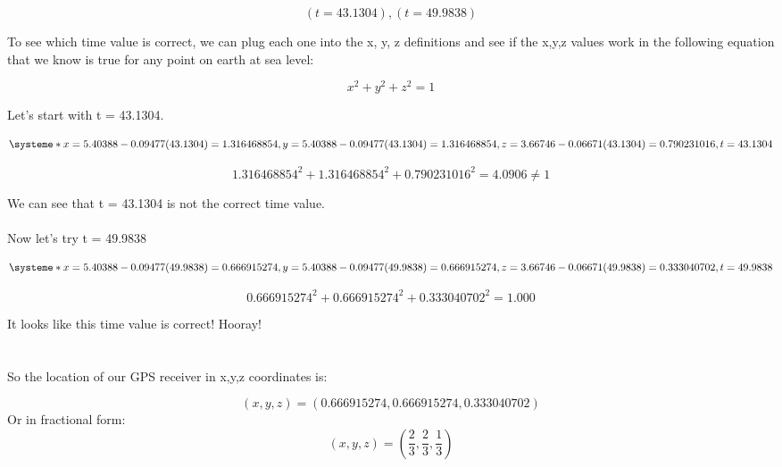 \documentclass{article}
\begin{document}
  \begin{equation*}
    (t = 43.1304), (t = 49.9838)
\end{equation*} 

\noindent To see which time value is correct, we can plug each one into the x, y, z definitions and see if the x,y,z values work in the following equation that we know is true for any point on earth at sea level:

\begin{equation*}
    x^{2} + y^{2} + z^{2} = 1
\end{equation*} 

Let's start with t = 43.1304.

\[
\systeme*{  x = 5.40388 - 0.09477(43.1304) = 1.316468854, 
            y = 5.40388 - 0.09477(43.1304) = 1.316468854, 
            z = 3.66746 - 0.06671(43.1304) = 0.790231016, 
            t = 43.1304}
\]

\begin{equation*}
    1.316468854^{2} + 1.316468854^{2} + 0.790231016^{2} = 4.0906 \neq 1
\end{equation*} 

We can see that t = 43.1304 is not the correct time value. \\ \\
\indent Now let's try t = 49.9838

\[
\systeme*{  x = 5.40388 - 0.09477(49.9838) = 0.666915274, 
            y = 5.40388 - 0.09477(49.9838) = 0.666915274, 
            z = 3.66746 - 0.06671(49.9838) = 0.333040702, 
            t = 49.9838}
\]

\begin{equation*}
    0.666915274^{2} + 0.666915274^{2} + 0.333040702^{2} = 1.000
\end{equation*} 

It looks like this time value is correct!  Hooray! \\ \\ \\
So the location of our GPS receiver in x,y,z coordinates is:

\begin{equation*}
    (x,y,z) = (0.666915274, 0.666915274, 0.333040702)
\end{equation*} 
Or in fractional form:
\begin{equation*}
    (x,y,z) = (\frac{2}{3} , \frac{2}{3} , \frac{1}{3})
\end{equation*} 

\end{document}
